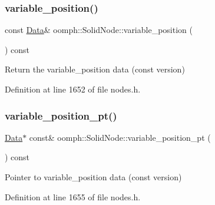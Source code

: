 \subsubsection{\texorpdfstring{variable\+\_\+position()}{variable\_position()}}
{\footnotesize\ttfamily const \hyperlink{classoomph_1_1Data}{Data}\& oomph\+::\+Solid\+Node\+::variable\+\_\+position (\begin{DoxyParamCaption}{ }\end{DoxyParamCaption}) const\hspace{0.3cm}{\ttfamily [inline]}}



Return the variable\+\_\+position data (const version) 



Definition at line 1652 of file nodes.\+h.

\mbox{\label{classoomph_1_1SolidNode_ae9a8abd197728f5555730131fa0f6971}} 
\subsubsection{\texorpdfstring{variable\+\_\+position\+\_\+pt()}{variable\_position\_pt()}}
{\footnotesize\ttfamily \hyperlink{classoomph_1_1Data}{Data}$\ast$ const\& oomph\+::\+Solid\+Node\+::variable\+\_\+position\+\_\+pt (\begin{DoxyParamCaption}{ }\end{DoxyParamCaption}) const\hspace{0.3cm}{\ttfamily [inline]}}



Pointer to variable\+\_\+position data (const version) 



Definition at line 1655 of file nodes.\+h.



